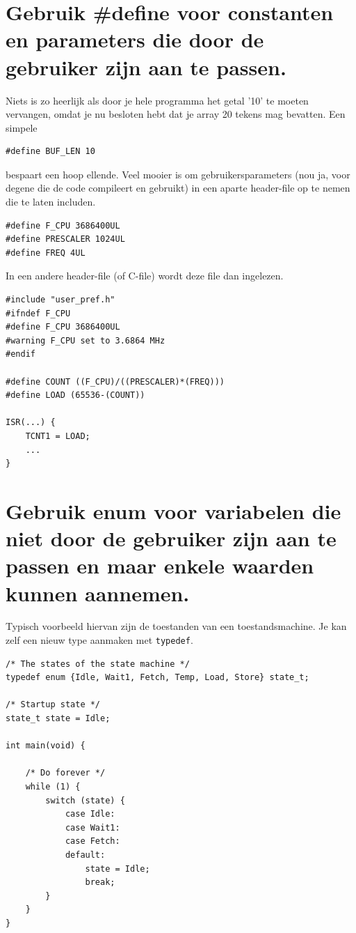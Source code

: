 \documentclass[12pt,a4paper,final,twoside,fleqn]{article}
\def\lstC{\lstinline[style=C]}
\begin{document}
\section{Gebruik \#define voor constanten en parameters die door de gebruiker zijn aan te passen.}
\index{\lstC{#define}}
Niets is zo heerlijk als door je hele programma het getal '10' te moeten vervangen,
omdat je nu besloten hebt dat je array 20 tekens mag bevatten. Een simpele

\begin{lstlisting}[style=C,numbers=none,belowcaptionskip=-12pt]
#define BUF_LEN 10
\end{lstlisting}

bespaart een hoop ellende. Veel mooier is om gebruikersparameters (nou ja, voor degene
die de code compileert en gebruikt) in een aparte header-file op te nemen die te laten includen.

\begin{lstlisting}[style=C,numbers=none,caption=Voorbeeld header file met User Preferences]
#define F_CPU 3686400UL
#define PRESCALER 1024UL
#define FREQ 4UL
\end{lstlisting}

In een andere header-file (of C-file) wordt deze file dan ingelezen.

\begin{lstlisting}[style=C,numbers=none,caption=Gebruik van header file]
#include "user_pref.h"
#ifndef F_CPU
#define F_CPU 3686400UL
#warning F_CPU set to 3.6864 MHz
#endif

#define COUNT ((F_CPU)/((PRESCALER)*(FREQ)))
#define LOAD (65536-(COUNT))

ISR(...) {
	TCNT1 = LOAD;
	...
}
\end{lstlisting}

\section{Gebruik enum voor variabelen die niet door de gebruiker zijn 
aan te passen en maar enkele waarden kunnen aannemen.}
\index{\lstC{enum}}
Typisch voorbeeld hiervan zijn de toestanden van een toestandsmachine.
Je kan zelf een nieuw type aanmaken met \lstC{typedef}.

\begin{lstlisting}[style=C,caption=Voorbeeld van een toestandsmachine]
/* The states of the state machine */
typedef enum {Idle, Wait1, Fetch, Temp, Load, Store} state_t;

/* Startup state */
state_t state = Idle;

int main(void) {

	/* Do forever */
	while (1) {
		switch (state) {
			case Idle:
			case Wait1:
			case Fetch:
			default:
				state = Idle;
				break;
		}
	}
}
\end{lstlisting}
\end{document}
